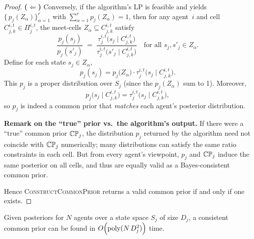 \begin{proof}
\noindent
\textbf{(\(\Longleftarrow\))}\quad
Conversely, if the algorithm’s LP is feasible and yields $\bigl\{\,p_j(Z_\alpha)\bigr\}_{\alpha=1}^r$ with $\sum_{\alpha=1}^r p_j(Z_\alpha)=1$, then for any agent~$i$ and cell $C_{j,k}^{i,t}\in \Pi_j^{i,t}$, the meet‐cells $Z_\alpha\subseteq
C_{j,k}^{i,t}$ satisfy
\begin{equation*}
  \frac{p_j(s_j)}{p_j(s'_j)}
  \;=\;
  \frac{\tau^{i,t}_j\bigl(s_j \mid C_{j,k}^{i,t}\bigr)}
       {\tau^{i,t}_j\bigl(s'_j \mid C_{j,k}^{i,t}\bigr)}
  \quad
  \text{for all } s_j,s'_j\in Z_\alpha.
\end{equation*}
Define for each state $s_j\in Z_\alpha$,
\begin{equation*}
  p_j(s_j) = p_j\bigl(Z_\alpha\bigr)\cdot\tau^{i,t}_j\bigl(s_j \mid C_{j,k}^{i,t}\bigr).
\end{equation*}
This $p_j$ is a proper distribution over $S_j$ (since the $p_j(Z_\alpha)$ sum to 1).
Moreover,
\begin{equation*}
  p_j\bigl(s_j\mid C_{j,k}^{i,t}\bigr) = \tau^{i,t}_j\bigl(s_j \mid C_{j,k}^{i,t}\bigr),
\end{equation*}
so $p_j$ is indeed a common prior that \emph{matches} each agent’s posterior distribution.

\medskip

\noindent
\textbf{Remark on the ``true'' prior vs.\ the algorithm's output.}  
If there were a ``true'' common prior $\mathbb{C}\mathbb{P}_j$, the distribution $p_j$ returned by the algorithm need not coincide with $\mathbb{C}\mathbb{P}_j$ numerically; many distributions can satisfy the same ratio constraints in each cell.
But from every agent's viewpoint, $p_j$ and $\mathbb{C}\mathbb{P}_j$ induce the same posterior on all cells, and thus are equally valid as a Bayes‐consistent common prior.

Hence \textsc{ConstructCommonPrior} returns a valid common prior if and only if one exists.
\end{proof}

\begin{lemma}
\label{lem:cp-runtime}
Given posteriors for $N$ agents over a state space $S_j$ of size $D_j$, a consistent common prior can be found in $O\Bigl(\mathrm{poly}(N\,D_j^2)\Bigr)$ time.
\end{lemma}

